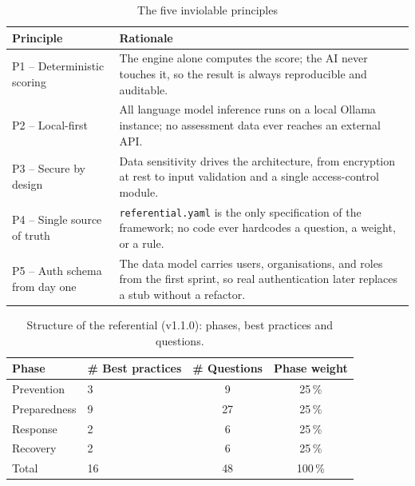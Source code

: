 \begin{table}[htbp]
  \centering
  \begin{tabular}{@{}p{}p{}@{}}
    \toprule
    Principle & Rationale \\
    \midrule
    P1 -- Deterministic scoring & The engine alone computes the score; the AI never touches it, so the result is always reproducible and auditable. \\
    P2 -- Local-first & All language model inference runs on a local Ollama instance; no assessment data ever reaches an external API. \\
    P3 -- Secure by design & Data sensitivity drives the architecture, from encryption at rest to input validation and a single access-control module. \\
    P4 -- Single source of truth & \texttt{referential.\allowbreak yaml} is the only specification of the framework; no code ever hardcodes a question, a weight, or a rule. \\
    P5 -- Auth schema from day one & The data model carries users, organisations, and roles from the first sprint, so real authentication later replaces a stub without a refactor. \\
    \bottomrule
  \end{tabular}
  \caption{The five inviolable principles}
  \label{tab:principles-summary}
\end{table}

\begin{table}[htbp]
  \centering
  \caption{Structure of the referential (v1.1.0): phases, best practices and questions.}
  \label{tab:se-referential}
  \begin{tabular}{llcc}
    \toprule
    Phase & \# Best practices & \# Questions & Phase weight \\
    \midrule
    Prevention   & 3  & 9  & 25\,\% \\
    Preparedness & 9  & 27 & 25\,\% \\
    Response     & 2  & 6  & 25\,\% \\
    Recovery     & 2  & 6  & 25\,\% \\
    \midrule
    Total        & 16 & 48 & 100\,\% \\
    \bottomrule
  \end{tabular}
\end{table}

\clearpage

